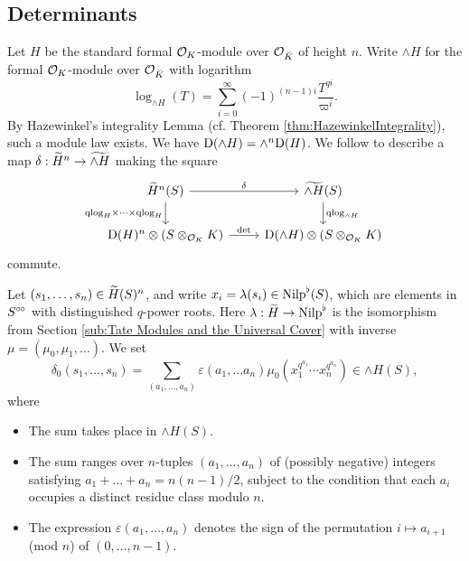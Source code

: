 \documentclass[../main.tex]{subfiles}
\begin{document}
\subsection{Determinants} %
\label{sub:Determinants}
Let $H$ be the standard formal $\cO_K$-module over $\cO_{\breve K}$ of height
$n$. Write $\wedge H$ for the formal $\cO_K$-module over $\cO_{\breve K}$ with
logarithm
\begin{equation*}
  \log_{\wedge H}(T) = \sum_{i = 0}^\infty (-1)^{(n-1)i} \frac{T^{qi}}{\varpi^i}.
\end{equation*}
By Hazewinkel's integrality Lemma (cf. Theorem \ref{thm:HazewinkelIntegrality}), 
such a module law exists. We have $\Dio(\wedge H) = \wedge^n \Dio(H)$. 
We follow \cite[Theorem 2.10.3]{BoyarchenkoWeinstein2011MaxVar} to describe a map $\delta:
\Tilde H^n \to \Tilde {\wedge H}$ making the square
\begin{equation}\label{diag:qlogsquare}
\begin{tikzcd}[ampersand replacement=\&]
	{\Tilde H^n(S)} \& {\Tilde{\wedge H}(S)} \\
	{\Dio(H)^n \otimes (S\otimes_{\cO_K} K)} \& {\Dio(\wedge H) \otimes(S\otimes_{\cO_K}K)}
	\arrow["\delta", from=1-1, to=1-2]
	\arrow["\qlog_H \times \dots \times \qlog_H"', from=1-1, to=2-1]
  \arrow["\qlog_{\wedge H}", from=1-2, to=2-2]
	\arrow["\det", from=2-1, to=2-2]
\end{tikzcd}
\end{equation}
commute. 

Let $(s_1, \dots, s_n) \in \Tilde H(S)^n$, and write $x_i = \lambda(s_i) \in
\Nilp^\flat(S)$, which are elements in $S^\cici$ with distinguished $q$-power
roots. Here $\lambda: \Tilde H \to \Nilp^\flat$ is the isomorphism from Section
\ref{sub:Tate Modules and the Universal Cover} with inverse $\mu = (\mu_0,
\mu_1, \dots)$. 
We set
\begin{equation*}
  \delta_0(s_1, \dots, s_n) = \sum_{(a_1, \dots, a_n)} \varepsilon(a_1, \dots
  a_n) \mu_0(x_1^{q^{a_1}} \cdots x_n^{q^{a_n}}) \in \wedge H(S),
\end{equation*}
where 
\begin{itemize}
  \item The sum takes place in ${\wedge H}(S)$.
  \item The sum ranges over $n$-tuples $(a_1, \dots, a_n)$ of (possibly negative) integers 
    satisfying $a_1 + \dots + a_n = n (n-1)/2$, subject to the
    condition that each $a_i$ occupies a distinct residue class modulo $n$.
  \item The expression $\varepsilon(a_1, \dots, a_n)$ denotes the sign of the 
    permutation $i \mapsto a_{i+1}$ (mod $n$) of $(0, \dots, n-1)$.
\end{itemize}
\end{document}

